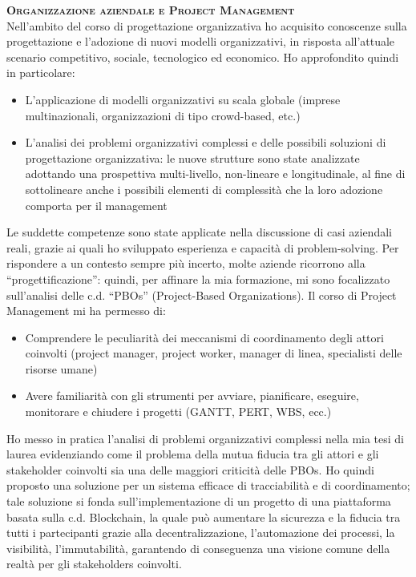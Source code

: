 \is
\textbf{\textsc{Organizzazione aziendale e Project Management}} \\
Nell’ambito del corso di progettazione organizzativa ho acquisito conoscenze sulla progettazione e l’adozione di nuovi modelli organizzativi, in risposta all’attuale scenario competitivo, sociale, tecnologico ed economico. Ho approfondito quindi in particolare: 
\begin{itemize}
	\item L’applicazione di modelli organizzativi su scala globale (imprese multinazionali, organizzazioni di tipo crowd-based, etc.)
	\item L’analisi dei problemi organizzativi complessi e delle possibili soluzioni di progettazione organizzativa: le nuove strutture sono state analizzate adottando una prospettiva multi-livello, non-lineare e longitudinale, al fine di sottolineare anche i possibili elementi di complessità che la loro adozione comporta per il management
\end{itemize}
Le suddette competenze sono state applicate nella discussione di casi aziendali reali, grazie ai quali ho sviluppato esperienza e capacità di problem-solving.
Per rispondere a un contesto sempre più incerto, molte aziende ricorrono alla “progettificazione”: quindi, per affinare la mia formazione, mi sono focalizzato sull’analisi delle c.d. “PBOs” (Project-Based Organizations).
Il corso di Project Management mi ha permesso di:
\begin{itemize}
	\item Comprendere le peculiarità dei meccanismi di coordinamento degli attori coinvolti (project manager, project worker, manager di linea, specialisti delle risorse umane)
	\item Avere familiarità con gli strumenti per avviare, pianificare, eseguire, monitorare e chiudere i progetti (GANTT, PERT, WBS, ecc.)
\end{itemize}
Ho messo in pratica l’analisi di problemi organizzativi complessi nella mia tesi di laurea evidenziando come il problema della mutua fiducia tra gli attori e gli stakeholder coinvolti sia una delle maggiori criticità delle PBOs. Ho quindi proposto una soluzione per un sistema efficace di tracciabilità e di coordinamento; tale soluzione si fonda sull’implementazione di un progetto di una piattaforma basata sulla c.d. Blockchain, la quale può aumentare la sicurezza e la fiducia tra tutti i partecipanti grazie alla decentralizzazione, l’automazione dei processi, la visibilità, l’immutabilità, garantendo di conseguenza una visione comune della realtà per gli stakeholders coinvolti.